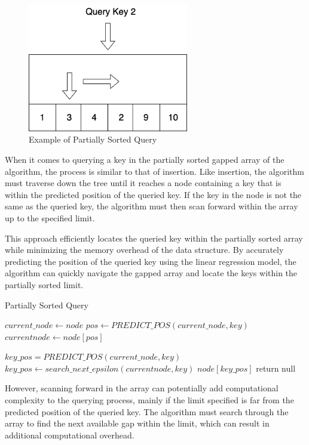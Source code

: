 \begin{figure}[H]
    \centering
    \includegraphics[width=70mm,scale=1]{Figures/QueryPartial.png}
    \caption{
     Example of Partially Sorted Query
    }
    \label{fig:PartialQueryExample}
\end{figure}
When it comes to querying a key in the partially sorted gapped array of the \learnindex algorithm, the process is similar to that of insertion. Like insertion, the algorithm must traverse down the tree until it reaches a node containing a key that is within the predicted position of the queried key. If the key in the node is not the same as the queried key, the algorithm must then scan forward within the array up to the specified limit.

This approach efficiently locates the queried key within the partially sorted array while minimizing the memory overhead of the \learnindex data structure. By accurately predicting the position of the queried key using the linear regression model, the algorithm can quickly navigate the gapped array and locate the keys within the partially sorted limit.
\begin{algorithm}
\caption{Partially Sorted Query}
\begin{algorithmic}[1]
\State $current\_node \gets node$
\State $pos \gets PREDICT\_POS(current\_node, key)$
    \State $current node \gets node[pos]$
    
\Else
    \State $key\_pos = PREDICT\_POS(current\_node, key)$
        \State $key\_pos \gets search\_next\_epsilon(current node, key)$
    \EndIf
    \State \Return $node[key\_pos]$
\EndIf
\EndWhile
\State return null
\EndProcedure
\end{algorithmic}
\end{algorithm}
However, scanning forward in the array can potentially add computational complexity to the querying process, mainly if the limit specified is far from the predicted position of the queried key. The algorithm must search through the array to find the next available gap within the limit, which can result in additional computational overhead. 

